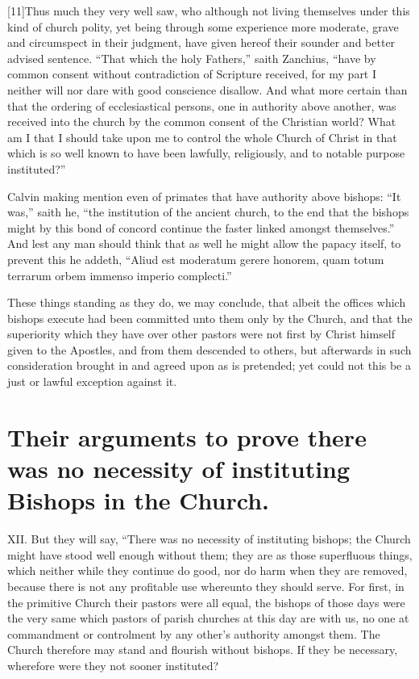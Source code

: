 [11]Thus much they very well saw, who although not living themselves under this kind of church polity, yet being through some experience more moderate, grave and circumspect in their judgment, have given hereof their sounder and better advised sentence. “That which the holy Fathers,” saith Zanchius, “have by common consent without contradiction of Scripture received, for my part I neither will nor dare with good conscience disallow. And what more certain than that the ordering of ecclesiastical persons, one in authority above another, was received into the church by the common consent of the Christian world? What am I that I should take upon me to control the whole Church of Christ in that which is so well known to have been lawfully, religiously, and to notable purpose instituted?”

Calvin making mention even of primates that have authority above bishops: “It was,” saith he, “the institution of the ancient church, to the end that the bishops might by this bond of concord continue the faster linked amongst themselves.” And lest any man should think that as well he might allow the papacy itself, to prevent this he addeth, “Aliud est moderatum gerere honorem, quam totum terrarum orbem immenso imperio complecti.”


These things standing as they do, we may conclude, that albeit the offices which bishops execute had been committed unto them only by the Church, and that the superiority which they have over other pastors were not first by Christ himself given to the Apostles, and from them descended to others, but afterwards in such consideration brought in and agreed upon as is pretended; yet could not this be a just or lawful exception against it.

\section*{Their arguments to prove there was no necessity of instituting Bishops in the Church.}

XII. But they will say, “There was no necessity of instituting bishops; the Church might have stood well enough without them; they are as those superfluous things, which neither while they continue do good, nor do harm when they are removed, because there is not any profitable use whereunto they should serve. For first, in the primitive Church their pastors were all equal, the bishops of those days were the very same which pastors of parish churches at this day are with us, no one at commandment or controlment by any other’s authority amongst them. The Church therefore may stand and flourish without bishops. If they be necessary, wherefore were they not sooner instituted?

